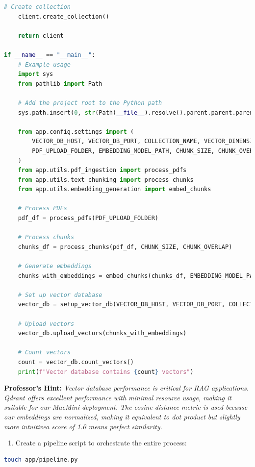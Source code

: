 \documentclass[
  screen,review,acmlarge]{acmart}
\providecommand{\tightlist}{%
  \setlength{\itemsep}{0pt}\setlength{\parskip}{0pt}}
\begin{document}
\begin{lstlisting}[language=Python]
    # Create collection
    client.create_collection()
    
    return client

if __name__ == "__main__":
    # Example usage
    import sys
    from pathlib import Path
    
    # Add the project root to the Python path
    sys.path.insert(0, str(Path(__file__).resolve().parent.parent.parent))
    
    from app.config.settings import (
        VECTOR_DB_HOST, VECTOR_DB_PORT, COLLECTION_NAME, VECTOR_DIMENSION,
        PDF_UPLOAD_FOLDER, EMBEDDING_MODEL_PATH, CHUNK_SIZE, CHUNK_OVERLAP
    )
    from app.utils.pdf_ingestion import process_pdfs
    from app.utils.text_chunking import process_chunks
    from app.utils.embedding_generation import embed_chunks
    
    # Process PDFs
    pdf_df = process_pdfs(PDF_UPLOAD_FOLDER)
    
    # Process chunks
    chunks_df = process_chunks(pdf_df, CHUNK_SIZE, CHUNK_OVERLAP)
    
    # Generate embeddings
    chunks_with_embeddings = embed_chunks(chunks_df, EMBEDDING_MODEL_PATH)
    
    # Set up vector database
    vector_db = setup_vector_db(VECTOR_DB_HOST, VECTOR_DB_PORT, COLLECTION_NAME, VECTOR_DIMENSION)
    
    # Upload vectors
    vector_db.upload_vectors(chunks_with_embeddings)
    
    # Count vectors
    count = vector_db.count_vectors()
    print(f"Vector database contains {count} vectors")
\end{lstlisting}

\textbf{Professor's Hint:} \emph{Vector database performance is critical for RAG applications. Qdrant offers excellent performance with minimal resource usage, making it suitable for our MacMini deployment. The cosine distance metric is used because our embeddings are normalized, making it equivalent to dot product but slightly more intuitivea score of 1.0 means perfect similarity.}

\begin{enumerate}
\def\labelenumi{\arabic{enumi}.}
\setcounter{enumi}{4}
\tightlist
\item
  Create a pipeline script to orchestrate the entire process:
\end{enumerate}

\begin{lstlisting}[language=bash]
touch app/pipeline.py
\end{lstlisting}
\end{document}
